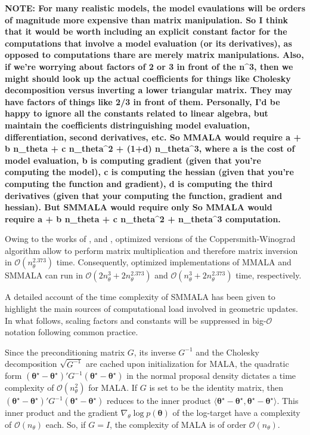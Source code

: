 \documentclass[twoside,11pt]{article}
\begin{document}
{\bf NOTE:  For many realistic models, the model evaulations will be orders of magnitude more expensive than matrix manipulation.  So I think that it would be worth including an explicit constant factor for the computations that involve a model evaluation (or its derivatives), as opposed to computations thare are merely matrix manipulations.  Also, if we're worrying about factors of 2 or 3 in front of the n^3, then we might should look up the actual coefficients for things like Cholesky decomposition versus inverting a lower triangular matrix.  They may have factors of things like 2/3 in front of them.  Personally, I'd be happy to ignore all the constants related to linear algebra, but maintain the coefficients distringuishing model evaluation, differentiation, second derivatives, etc.  So MMALA would require a + b  n_theta + c n_theta^2 + (1+d) n_theta^3, where a is the cost of model evaluation, b is computing gradient (given that you're computing the model), c is computing the hessian (given that you're computing the function and gradient), d is computing the third derivatives (given that your computing the function, gradient and hessian).  But SMMALA would require only So MMALA would require a + b  n_theta + c n_theta^2 + n_theta^3 computation.  }

Owing to the works of \cite{dav_sto__imp}, \cite{wil__brea} and \cite{leg__pow},
optimized versions of the Coppersmith-Winograd algorithm allow to perform matrix multiplication and therefore matrix 
inversion in $\mathcal{O}(n_\theta^{2.373})$ time. Consequently, optimized implementations of MMALA and SMMALA can run in
$\mathcal{O}(2n_\theta^3+2n_\theta^{2.373})$ and $\mathcal{O}(n_\theta^3+2n_\theta^{2.373})$ time, respectively.

A detailed account of the time complexity of SMMALA has been given to highlight the main sources of computational load
involved in geometric updates. In what follows, scaling factors and constants will be suppressed in big-$\mathcal{O}$ 
notation following common practice.

Since the preconditioning matrix $G$, its inverse $G^{-1}$ and the Cholesky decomposition $\sqrt{G^{-1}}$ are cached upon 
initialization for MALA, the quadratic form
$
(\boldsymbol{\theta}^{\star}-\boldsymbol{\theta}^{\star})'
G^{-1}
(\boldsymbol{\theta}^{\star}-\boldsymbol{\theta}^{\star})
$
in the normal proposal density dictates a time complexity of $\mathcal{O}(n_{\theta}^2)$ for MALA. If $G$ is set to be the 
identity matrix, then
$
(\boldsymbol{\theta}^{\star}-\boldsymbol{\theta}^{\star})'
G^{-1}
(\boldsymbol{\theta}^{\star}-\boldsymbol{\theta}^{\star})
$
reduces to the inner product
$
\langle\boldsymbol{\theta}^{\star}-\boldsymbol{\theta}^{\star},
\boldsymbol{\theta}^{\star}-\boldsymbol{\theta}^{\star}\rangle
$. This inner product and the gradient $\nabla_{\theta}\log{p(\boldsymbol{\theta})}$  of the log-target have a complexity of 
$\mathcal{O}(n_{\theta})$ each. So, if $G=I$, the complexity of MALA is of order $\mathcal{O}(n_{\theta})$.
\end{document}
